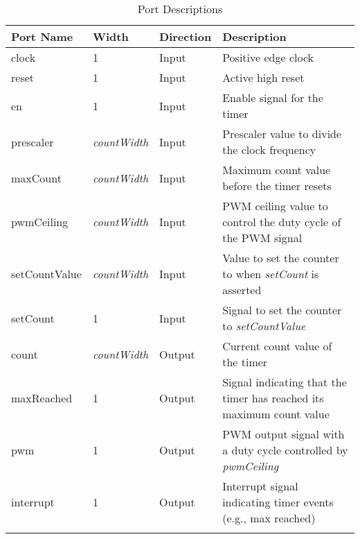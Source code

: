 \renewcommand*{\arraystretch}{1.4}
\begin{longtable}[H]{
  | p{}
  | p{}
  | p{}
  | p{} |
  }
  \hline
  \textbf{Port Name} &
  \textbf{Width} &
  \textbf{Direction} &
  \textbf{Description} \\ \hline \hline

  clock &
  1 &
  Input &
  Positive edge clock \\ \hline

  reset &
  1 &
  Input &
  Active high reset \\ \hline

  en &
  1 &
  Input &
  Enable signal for the timer \\ \hline

  prescaler &
  \textit{countWidth} &
  Input &
  Prescaler value to divide the clock frequency \\ \hline

  maxCount &
  \textit{countWidth} &
  Input &
  Maximum count value before the timer resets \\ \hline

  pwmCeiling &
  \textit{countWidth} &
  Input &
  PWM ceiling value to control the duty cycle of the PWM signal \\ \hline

  setCountValue &
  \textit{countWidth} &
  Input &
  Value to set the counter to when \textit{setCount} is asserted \\ \hline

  setCount &
  1 &
  Input &
  Signal to set the counter to \textit{setCountValue} \\ \hline

  count &
  \textit{countWidth} &
  Output &
  Current count value of the timer \\ \hline

  maxReached &
  1 &
  Output &
  Signal indicating that the timer has reached its maximum count value \\ \hline

  pwm &
  1 &
  Output &
  PWM output signal with a duty cycle controlled by \textit{pwmCeiling} \\ \hline

  interrupt &
  1 &
  Output &
  Interrupt signal indicating timer events (e.g., max reached) \\ \hline

  \caption{Port Descriptions}\label{table:ports}
\end{longtable}